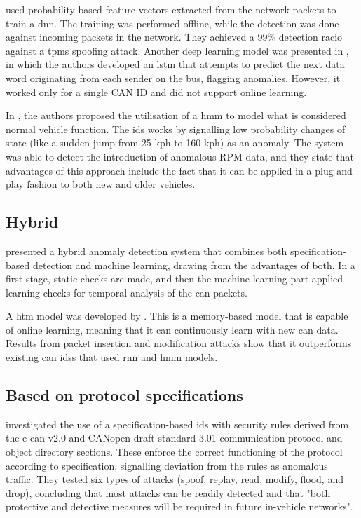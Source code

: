 \cite{kang2016intrusion} used probability-based feature vectors extracted from the network packets to train a \acrlong{dnn}. The training was performed offline, while the detection was done against incoming packets in the network. They achieved a 99\% detection racio against a \gls{tpms} spoofing attack. Another deep learning model was presented in \cite{Taylor2016}, in which the authors developed an \gls{lstm} that attempts to predict the next data word originating from each sender on the bus, flagging anomalies. However, it worked only for a single CAN ID and did not support online learning.\par
In \cite{narayanan2016obd_securealert}, the authors proposed the utilisation of a \gls{hmm} to model what is considered normal vehicle function. The \gls{ids} works by signalling low probability changes of state (like a sudden jump from 25 kph to 160 kph) as an anomaly. The system was able to detect the introduction of anomalous RPM data, and they state that advantages of this approach include the fact that it can be applied in a plug-and-play fashion to both new and older vehicles.

\subsection{Hybrid}

\cite{weber2018embedded} presented a hybrid anomaly detection system that combines both specification-based detection and machine learning, drawing from the advantages of both. In a first stage, static checks are made, and then the machine learning part applied learning checks for temporal analysis of the \gls{can} packets.\par
A \gls{htm} model was developed by \cite{wang2018distributed}. This is a memory-based model that is capable of online learning, meaning that it can continuously learn with new \gls{can} data. Results from packet insertion and modification attacks show that it outperforms existing \gls{can} \glspl{ids} that used \gls{rnn} and \gls{hmm} models.

\subsection{Based on protocol specifications}

\cite{larson2008approach} investigated the use of a specification-based \gls{ids} with security rules derived from the e \gls{can} v2.0 and CANopen draft standard 3.01 communication protocol and object directory sections. These enforce the correct functioning of the protocol according to specification, signalling deviation from the rules as anomalous traffic. They tested six types of attacks (spoof, replay, read, modify, flood, and drop), concluding that most attacks can be readily detected and that "both protective and detective measures will be required in future in-vehicle networks".

